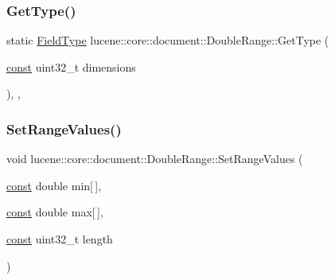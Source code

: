 \subsubsection{\texorpdfstring{Get\+Type()}{GetType()}}
{\footnotesize\ttfamily static \mbox{\hyperlink{classlucene_1_1core_1_1document_1_1FieldType}{Field\+Type}} lucene\+::core\+::document\+::\+Double\+Range\+::\+Get\+Type (\begin{DoxyParamCaption}\item[{\mbox{\hyperlink{ZlibCrc32_8h_a2c212835823e3c54a8ab6d95c652660e}{const}} uint32\+\_\+t}]{dimensions }\end{DoxyParamCaption})\hspace{0.3cm}{\ttfamily [inline]}, {\ttfamily [static]}, {\ttfamily [private]}}

\mbox{\label{classlucene_1_1core_1_1document_1_1DoubleRange_a86f4a1467c114de406f39fd311675055}} 
\subsubsection{\texorpdfstring{Set\+Range\+Values()}{SetRangeValues()}}
{\footnotesize\ttfamily void lucene\+::core\+::document\+::\+Double\+Range\+::\+Set\+Range\+Values (\begin{DoxyParamCaption}\item[{\mbox{\hyperlink{ZlibCrc32_8h_a2c212835823e3c54a8ab6d95c652660e}{const}} double}]{min\mbox{[}$\,$\mbox{]},  }\item[{\mbox{\hyperlink{ZlibCrc32_8h_a2c212835823e3c54a8ab6d95c652660e}{const}} double}]{max\mbox{[}$\,$\mbox{]},  }\item[{\mbox{\hyperlink{ZlibCrc32_8h_a2c212835823e3c54a8ab6d95c652660e}{const}} uint32\+\_\+t}]{length }\end{DoxyParamCaption})\hspace{0.3cm}{\ttfamily [inline]}}

\mbox{\label{classlucene_1_1core_1_1document_1_1DoubleRange_a2171d66292b3437034c90c68baaa08db}} 
